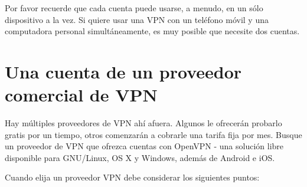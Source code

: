 \documentclass[10pt,a5paper,twoside,,]{book}
\begin{document}
Por favor recuerde que cada cuenta puede usarse, a menudo, en un sólo
dispositivo a la vez. Si quiere usar una VPN con un teléfono móvil y una
computadora personal simultáneamente, es muy posible que necesite dos
cuentas.

\section{Una cuenta de un proveedor comercial de
VPN}\label{una-cuenta-de-un-proveedor-comercial-de-vpn}

Hay múltiples proveedores de VPN ahí afuera. Algunos le ofrecerán
probarlo gratis por un tiempo, otros comenzarán a cobrarle una tarifa
fija por mes. Busque un proveedor de VPN que ofrezca cuentas con OpenVPN
- una solución libre disponible para GNU/Linux, OS X y Windows, además
de Android e iOS.

Cuando elija un proveedor VPN debe considerar los siguientes puntos:
\end{document}
